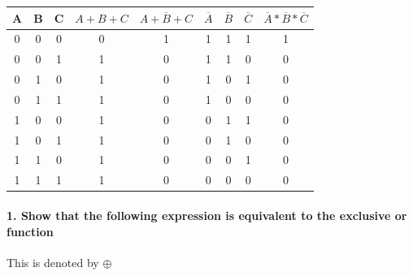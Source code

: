 \documentclass{article}
\begin{document}
\begin{enumerate}
	\begin{table}[H]
		\centering
		\begin{tabular}{|c|c|c|c|c|c|c|c|c|}
			\hline
			A & B & C & $A+B+C$ & $\overline{A+B+C}$ & $\overline{A}$ & $\overline{B}$ & $\overline{C}$ & $\overline{A}*\overline{B}*\overline{C}$ \\\hline
			0 & 0 & 0 & 0     & 1                & 1            & 1            & 1   	  & 1                                      \\\hline
			0 & 0 & 1 & 1     & 0                & 1            & 1            & 0            & 0                                      \\\hline
			0 & 1 & 0 & 1     & 0                & 1            & 0            & 1            & 0                                      \\\hline
			0 & 1 & 1 & 1     & 0                & 1            & 0            & 0            & 0                                      \\\hline
			1 & 0 & 0 & 1     & 0                & 0            & 1            & 1            & 0                                      \\\hline
			1 & 0 & 1 & 1     & 0                & 0            & 1            & 0            & 0                                      \\\hline
			1 & 1 & 0 & 1     & 0                & 0            & 0            & 1            & 0                                      \\\hline
			1 & 1 & 1 & 1     & 0                & 0            & 0            & 0            & 0                                      \\\hline
		\end{tabular}
	\end{table}
\end{enumerate}

\paragraph{1. Show that the following expression is equivalent to the exclusive or function}

This is denoted by $\oplus$
\end{document}
